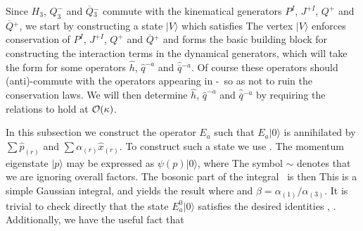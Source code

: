 Since $H_3$, $Q^-_3$ and $\overline{Q}{}^-_3$ commute with the
kinematical generators $P^I$, $J^{+I}$, $Q^+$ and $\overline{Q}{}^+$, we start
by constructing a state $|V\rangle$ which satisfies
\eqn{}
\eqn{}
\eqn{}
\eqn{}
The vertex $|V\rangle$ enforces conservation of $P^I$, $J^{+I}$, $Q^+$
and $\overline{Q}{}^+$ and forms the basic building block for constructing
the interaction terms in the dynamical generators, which will take
the form
\eqn{}
for some operators $\hat{h}$, $\hat{q}^{- \dot{a}}$
and $\hat{\overline{q}}{}^{- \dot{a}}$.
Of course these operators should (anti)-commute with the operators
appearing in \breqone-\freqtwo\ so as not to ruin the conservation
laws.
We will then determine $\hat{h}$, $\hat{q}^{- \dot{a}}$ and
$\hat{\overline{q}}{}^{- \dot{a}}$
by requiring the relations
\eqn{}
to hold at ${\cal{O}}(\kappa)$.


In this subsection we construct the operator $E_a$ such that
$E_a |0\rangle$ is annihilated by $\sum \hat{p}_{(r)}$ and
$\sum \alpha_{(r)} \hat{x}_{(r)}$.
To construct such a state we use \vertex.  The momentum eigenstate
$|p\rangle$ may be expressed as $\psi(p)|0\rangle$, where
\eqn{}
The symbol $\sim$ denotes that we are ignoring overall factors.
The bosonic part of the integral \vertex\ is then
\eqn{}
This is a simple Gaussian integral, and yields the result
\eqn{}
where
\eqn{}
and $\beta =  \alpha_{(1)}/\alpha_{(3)}$.
It is trivial to check directly
that the state $E_a^0 |0\rangle$ satisfies the
desired identities \breqone, \breqtwo.
Additionally, we have the useful fact that
\eqn{}

